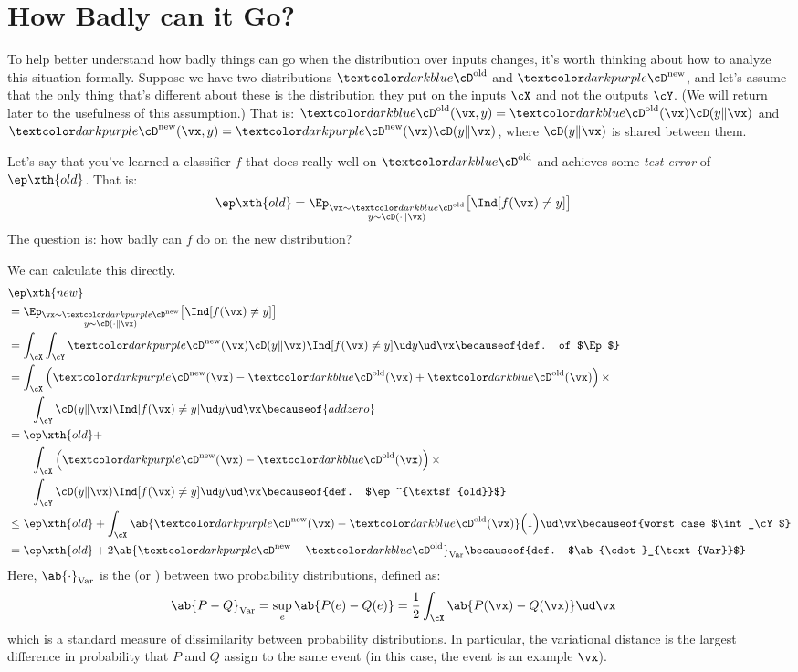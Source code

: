 \section{How Badly can it Go?}

To help better understand how badly things can go when the distribution over inputs changes, it's worth thinking about how to analyze this situation formally.
Suppose we have two distributions $\Dold$ and $\Dnew$, and let's assume that the only thing that's different about these is the distribution they put on the inputs $\cX$ and not the outputs $\cY$.
(We will return later to the usefulness of this assumption.)
That is: $\Dold(\vx,y) = \Dold(\vx) \cD(y \| \vx)$ and $\Dnew(\vx,y) = \Dnew(\vx) \cD(y \| \vx)$, where $\cD(y \| \vx)$ is shared between them.

Let's say that you've learned a classifier $f$ that does really well on $\Dold$ and achieves some \emph{test error} of $\ep\xth{old}$.
That is:
%
\begin{align}
  \ep\xth{old} &= \Ep_{\substack{\vx \sim \Dold\\y \sim \cD(\cdot \| \vx)}}\big[ \Ind[f(\vx) \neq y] \big]
\end{align}
%
The question is: how badly can $f$ do on the new distribution?

We can calculate this directly.
%
\begin{align}
  & \ep\xth{new} \nonumber \\
  &= \Ep_{\substack{\vx \sim \Dnew\\y \sim \cD(\cdot \| \vx)}}\big[ \Ind[f(\vx) \neq y] \big] \\
  &= \int_\cX \int_\cY \Dnew(\vx) \cD(y \| \vx) \Ind[f(\vx) \neq y] \ud y \ud \vx \becauseof{def. of $\Ep$} \\
  &= \int_\cX \left( \Dnew(\vx) - \Dold(\vx) + \Dold(\vx) \right)\times \nonumber\\
& \qquad \int_\cY \cD(y \| \vx) \Ind[f(\vx) \neq y] \ud y \ud \vx  \becauseof{add zero} \\
  &= \ep\xth{old} + \nonumber\\
  &\qquad \int_\cX \left( \Dnew(\vx) - \Dold(\vx)\right) \times \nonumber\\
  &\qquad\int_\cY \cD(y \| \vx) \Ind[f(\vx) \neq y] \ud y \ud \vx  \becauseof{def. $\ep^{\textsf{old}}$} \\
&\leq \ep\xth{old} + \int_\cX \ab{\Dnew(\vx) - \Dold(\vx)} \Big( 1 \Big) \ud \vx  \becauseof{worst case $\int_\cY$} \\
  &= \ep\xth{old} + 2 \ab{\Dnew - \Dold}_{\text{Var}} \becauseof{def. $\ab{\cdot}_{\text{Var}}$}
\end{align}
%
Here, $\ab{\cdot}_{\text{Var}}$ is the  (or ) between two probability distributions, defined as:
%
\begin{align}
  \ab{P - Q}_{\text{Var}}
  &= \sup_{e} \ab{P(e) - Q(e)}
  = \frac 1 2 \int_\cX \ab{P(\vx) - Q(\vx)} \ud \vx
\end{align}
%
which is a standard measure of dissimilarity between probability distributions. In particular, the variational distance is the largest difference in probability that $P$ and $Q$ assign to the same event (in this case, the event is an example $\vx$).

